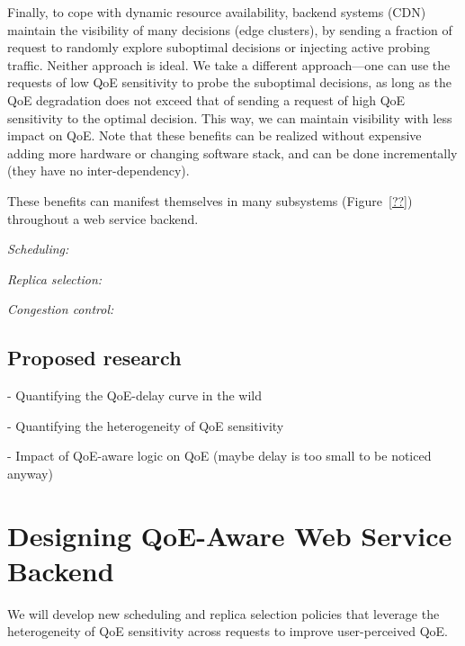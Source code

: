 Finally, to cope with dynamic resource availability, backend systems (\eg CDN) maintain the visibility of many decisions (\eg edge clusters), by sending a fraction of request to randomly explore suboptimal decisions or injecting active probing traffic.
Neither approach is ideal. 
We take a different approach---one can use the requests of low QoE sensitivity to probe the suboptimal decisions, as long as the QoE degradation does not exceed that of sending a request of high QoE sensitivity to the optimal decision.
This way, we can maintain visibility with less impact on QoE.
Note that these benefits can be realized without expensive adding more hardware or changing software stack, and can be done incrementally (they have no inter-dependency).

These benefits can manifest themselves in many subsystems (Figure~\ref{??}) throughout a web service backend.
\begin{packeditemize}
\item {\em Scheduling:}

\item {\em Replica selection:} 

\item {\em Congestion control:}

\end{packeditemize}

\subsection{Proposed research}

- Quantifying the QoE-delay curve in the wild

- Quantifying the heterogeneity of QoE sensitivity

- Impact of QoE-aware logic on QoE (maybe delay is too small to be noticed anyway)





\section{Designing QoE-Aware Web Service Backend}
\label{sec:design}

\begin{task}
We will develop new scheduling and replica selection policies that leverage the heterogeneity of QoE sensitivity across requests to improve user-perceived QoE.
\end{task}


